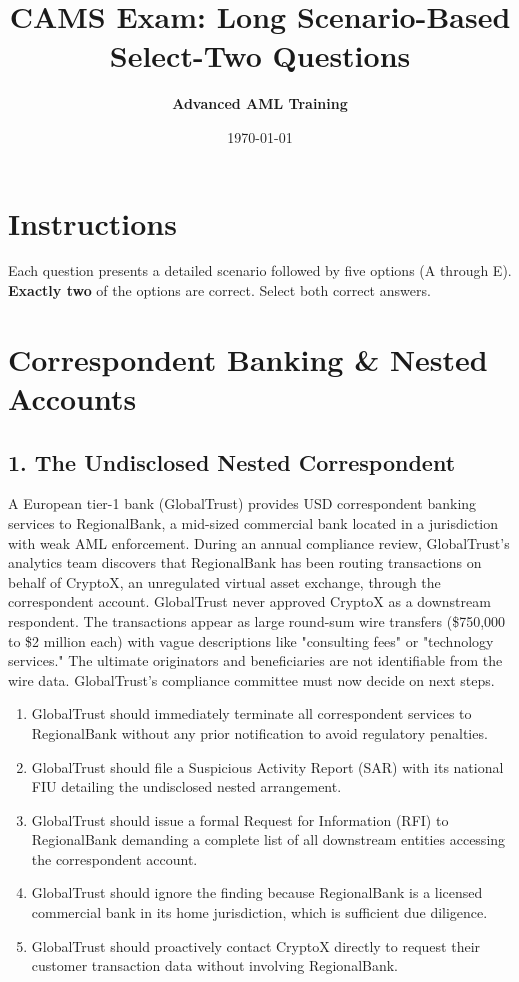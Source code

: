\documentclass[11pt,a4paper]{article}
\title{\textbf{CAMS Exam: Long Scenario-Based Select-Two Questions}}
\author{\textbf{Advanced AML Training}}
\date{\today}
\begin{document}
	
	\maketitle
	
	\section*{Instructions}
	Each question presents a detailed scenario followed by five options (A through E). \textbf{Exactly two} of the options are correct. Select both correct answers.
	
	\section{Correspondent Banking \& Nested Accounts}
	
	\subsection{1. The Undisclosed Nested Correspondent}
	
	A European tier-1 bank (GlobalTrust) provides USD correspondent banking services to RegionalBank, a mid-sized commercial bank located in a jurisdiction with weak AML enforcement. During an annual compliance review, GlobalTrust's analytics team discovers that RegionalBank has been routing transactions on behalf of CryptoX, an unregulated virtual asset exchange, through the correspondent account. GlobalTrust never approved CryptoX as a downstream respondent. The transactions appear as large round-sum wire transfers (\$750,000 to \$2 million each) with vague descriptions like "consulting fees" or "technology services." The ultimate originators and beneficiaries are not identifiable from the wire data. GlobalTrust's compliance committee must now decide on next steps.
	
	\begin{enumerate}[label=\Alph*.]
		\item GlobalTrust should immediately terminate all correspondent services to RegionalBank without any prior notification to avoid regulatory penalties.
		\item GlobalTrust should file a Suspicious Activity Report (SAR) with its national FIU detailing the undisclosed nested arrangement.
		\item GlobalTrust should issue a formal Request for Information (RFI) to RegionalBank demanding a complete list of all downstream entities accessing the correspondent account.
		\item GlobalTrust should ignore the finding because RegionalBank is a licensed commercial bank in its home jurisdiction, which is sufficient due diligence.
		\item GlobalTrust should proactively contact CryptoX directly to request their customer transaction data without involving RegionalBank.
	\end{enumerate}
	
\end{document}
